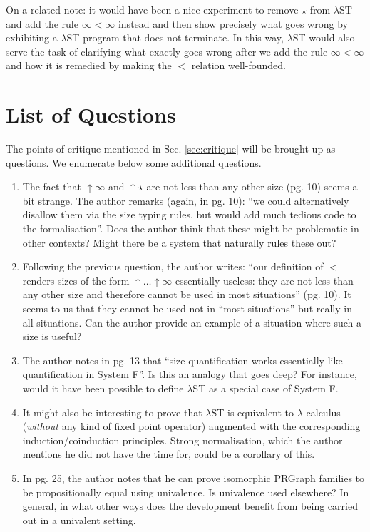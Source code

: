 \documentclass[a4paper, 11pt]{article}
\begin{document}
On a related note: it would have been a nice experiment to remove $\star$ from $\lambda$ST and add
the rule $∞ < ∞$ instead and then show precisely what goes wrong by exhibiting a $\lambda$ST
program that does not terminate. In this way, $\lambda$ST would also serve the task of
clarifying what exactly goes wrong after we add the rule $\infty < \infty$ and how it is remedied by
making the $<$ relation well-founded.

\section{List of Questions}

The points of critique mentioned in Sec. \ref{sec:critique} will be brought up as
questions. We enumerate below some additional questions.

\begin{enumerate}
  \item The fact that $\uparrow \infty$ and $\uparrow \star$ are not less than any other size (pg. 10) seems a
    bit strange. The author remarks (again, in pg. 10): ``we could alternatively disallow
    them via the size typing rules, but would add much tedious code to the
    formalisation''. Does the author think that these might be problematic in other
    contexts? Might there be a system that naturally rules these out?
  \item Following the previous question, the author writes: ``our definition of $<$
    renders sizes of the form $\uparrow \ldots \uparrow \infty$ essentially useless: they are not less than any
    other size and therefore cannot be used in most situations'' (pg. 10). It seems to us
    that they cannot be used not in ``most situations'' but really in all situations. Can
    the author provide an example of a situation where such a size is useful?
  \item The author notes in pg. 13 that ``size quantification works essentially like
    quantification in System F''. Is this an analogy that goes deep? For instance, would
    it have been possible to define $\lambda$ST as a special case of System F.
  \item It might also be interesting to prove that $\lambda$ST is equivalent to
    $\lambda$-calculus (\emph{without} any kind of fixed point operator) augmented with the
    corresponding induction/coinduction principles. Strong normalisation, which the author
    mentions he did not have the time for, could be a corollary of this.
  \item In pg. 25, the author notes that he can prove isomorphic PRGraph families to be
    propositionally equal using univalence. Is univalence used elsewhere? In general, in
    what other ways does the development benefit from being carried out in a univalent
    setting.
\end{enumerate}
\end{document}

